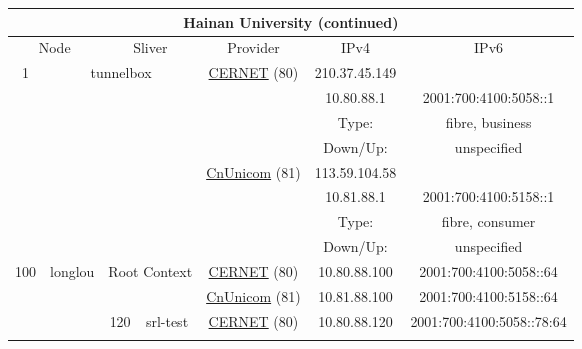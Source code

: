 \begin{small}
\begin{center}
\begin{longtable}{|c|c|c|c|c|c|c|c|}
\endfirsthead
\hline
 \multicolumn{8}{|c|}{\textbf{Hainan University (continued)}} \\ \hline
 \multicolumn{2}{|p{8em}|}{Node} & \multicolumn{2}{|p{8em}|}{Sliver} & \multicolumn{2}{|p{8em}|}{Provider} & IPv4 & IPv6 \\ \hline
\endhead
 \multirow{8}{*}{\tiny{1}} & \multicolumn{3}{|c|}{\multirow{8}{*}{\tiny{tunnelbox}}} & \multicolumn{2}{|c|}{\multirow{4}{*}{\tiny{\href{http://www.cernet.edu.cn}{CERNET} (80)}}} & \tiny{210.37.45.149} & \frownie{} \\* \cline{7-7}\cline{8-8}
  & \multicolumn{3}{|c|}{} & \multicolumn{2}{|c|}{} & \tiny{10.80.88.1} & \tiny{2001:700:4100:5058::1} \\* \cline{7-7}\cline{8-8}
  & \multicolumn{3}{|c|}{} & \multicolumn{2}{|c|}{} & Type: & fibre, business \\* \cline{7-7}\cline{8-8}
  & \multicolumn{3}{|c|}{} & \multicolumn{2}{|c|}{} & Down/Up:  & unspecified \\* \cline{5-5}\cline{6-6}\cline{7-7}\cline{8-8}
  & \multicolumn{3}{|c|}{} & \multicolumn{2}{|c|}{\multirow{4}{*}{\tiny{\href{http://www.chinaunicom.com}{CnUnicom} (81)}}} & \tiny{113.59.104.58} & \frownie{} \\* \cline{7-7}\cline{8-8}
  & \multicolumn{3}{|c|}{} & \multicolumn{2}{|c|}{} & \tiny{10.81.88.1} & \tiny{2001:700:4100:5158::1} \\* \cline{7-7}\cline{8-8}
  & \multicolumn{3}{|c|}{} & \multicolumn{2}{|c|}{} & Type: & fibre, consumer \\* \cline{7-7}\cline{8-8}
  & \multicolumn{3}{|c|}{} & \multicolumn{2}{|c|}{} & Down/Up:  & unspecified \\ \hline
 \multirow{22}{*}{\tiny{100}} & \multicolumn{1}{|l|}{\multirow{22}{*}{\tiny{longlou}}} & \multicolumn{2}{|c|}{\multirow{2}{*}{\tiny{Root Context}}} & \multicolumn{2}{|c|}{\tiny{\href{http://www.cernet.edu.cn}{CERNET} (80)}} & \tiny{10.80.88.100} & \tiny{2001:700:4100:5058::64} \\* \cline{5-5}\cline{6-6}\cline{7-7}\cline{8-8}
  &  & \multicolumn{2}{|c|}{} & \multicolumn{2}{|c|}{\tiny{\href{http://www.chinaunicom.com}{CnUnicom} (81)}} & \tiny{10.81.88.100} & \tiny{2001:700:4100:5158::64} \\* \cline{3-3}\cline{4-4}\cline{5-5}\cline{6-6}\cline{7-7}\cline{8-8}
  &  & \multirow{2}{*}{\tiny{120}} & \multicolumn{1}{|l|}{\multirow{2}{*}{\tiny{srl-test}}} & \multicolumn{2}{|c|}{\tiny{\href{http://www.cernet.edu.cn}{CERNET} (80)}} & \tiny{10.80.88.120} & \tiny{2001:700:4100:5058::78:64} \\* \cline{5-5}\cline{6-6}\cline{7-7}\cline{8-8}

\end{longtable}
\end{center}
\end{small}
